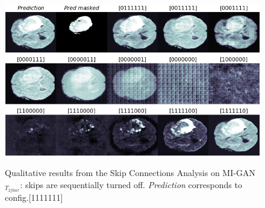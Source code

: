 \begin{figure}[H]
\centering
\caption[Qualitative results from turning off the skips in MI-GAN]{Qualitative results from the Skip Connections Analysis on MI-GAN{$_{T_{2flair}}$}: skips are sequentially turned off. \textit{Prediction} corresponds to config.[1111111]}
\includegraphics[width=0.635\textheight]{images/skips_migan.pdf}
\label{fig:qualitative_channels_off_migan}
\end{figure}


